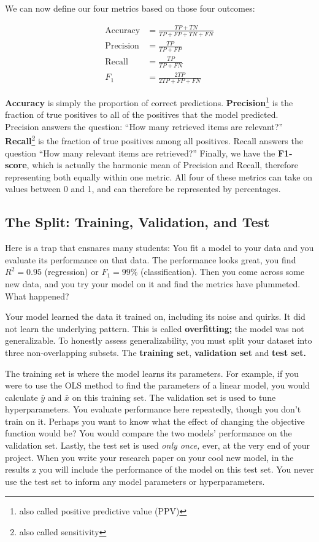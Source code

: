 We can now define our four metrics based on those four outcomes:

\begin{align}
    \text{Accuracy} &= \frac{TP + TN}{TP + FP + TN + FN} \\
    \text{Precision} &= \frac{TP}{TP + FP} \\
    \text{Recall} &= \frac{TP}{TP + FN} \\
    F_1 &= \frac{2TP}{2TP + FP + FN}
\end{align}

\noindent \textbf{Accuracy} is simply the proportion of correct predictions. \textbf{Precision}\footnote{also called positive predictive value (PPV)} is the fraction of true positives to all of the positives that the model predicted. Precision answers the question: ``How many retrieved items are relevant?'' \textbf{Recall}\footnote{also called sensitivity} is the fraction of true positives among all positives. Recall answers the question ``How many relevant items are retrieved?'' Finally, we have the \textbf{F1-score}, which is actually the harmonic mean of Precision and Recall, therefore representing both equally within one metric. All four of these metrics can take on values between 0 and 1, and can therefore be represented by percentages.

\subsection*{The Split: Training, Validation, and Test}
Here is a trap that ensnares many students: You fit a model to your data and you evaluate its performance on that data. The performance looks great, you find $R^2 = 0.95$ (regression) or $F_1=99\%$ (classification). Then you come across some new data, and you try your model on it and find the metrics have plummeted. What happened?

Your model learned the data it trained on, including its noise and quirks. It did not learn the underlying pattern. This is called \textbf{overfitting;} the model was not generalizable. To honestly assess generalizability, you must split your dataset into three non-overlapping subsets. The \textbf{training set}, \textbf{validation set} and \textbf{test set.}

The training set is where the model learns its parameters. For example, if you were to use the OLS method to find the parameters of a linear model, you would calculate $\bar{y}$ and $\bar{x}$ on this training set. The validation set is used to tune hyperparameters. You evaluate performance here repeatedly, though you don't train on it. Perhaps you want to know what the effect of changing the objective function would be? You would compare the two models' performance on the validation set. Lastly, the test set is used \textit{only once,} ever, at the very end of your project. When you write your research paper on your cool new model, in the results z you will include the performance of the model on this test set. You never use the test set to inform any model parameters or hyperparameters.

